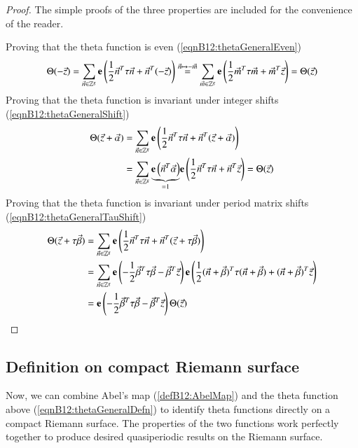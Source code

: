 \begin{proof} The simple proofs of the three properties are included for the convenience of the reader.

    Proving that the theta function is even (\ref{eqnB12:thetaGeneralEven})
    \begin{align}
        \Theta(-\vec z) = \sum_{\vec n \in \mathbb Z^g} \mathbf{e}\left(\frac{1}{2} \vec n^T \tau \vec n + \vec n^T (-\vec z)\right) \overset{\vec n \mapsto -\vec m}{=} \sum_{\vec m \in \mathbb Z^g} \mathbf{e}\left(\frac{1}{2} \vec m^T \tau \vec m + \vec m^T \vec z\right) = \Theta(\vec z)
    \end{align}
    Proving that the theta function is invariant under integer shifts (\ref{eqnB12:thetaGeneralShift})
    \begin{align}
        \Theta(\vec z + \vec \alpha) &= \sum_{\vec n \in \mathbb Z^g} \mathbf{e}\left(\frac{1}{2} \vec n^T \tau \vec n + \vec n^T (\vec z + \vec \alpha)\right) \\ &=
        \sum_{\vec n \in \mathbb Z^g} \underset{=1}{\underbrace{\mathbf{e}\left(\vec n^T \vec \alpha\right)}} \mathbf{e}\left(\frac{1}{2} \vec n^T \tau \vec n + \vec n^T \vec z\right) = \Theta(\vec z)
    \end{align}
    Proving that the theta function is invariant under period matrix shifts (\ref{eqnB12:thetaGeneralTauShift})
    \begin{align}
        \Theta(\vec z + \tau \vec \beta) &= \sum_{\vec n \in \mathbb Z^g} \mathbf{e}\left(\frac{1}{2} \vec n^T \tau \vec n + \vec n^T (\vec z + \tau \vec \beta)\right) \\ &=
        \sum_{\vec n \in \mathbb Z^g}
        \mathbf{e}\left(-\frac{1}{2} \vec \beta^T \tau \vec \beta - \vec \beta^T \vec z\right) \mathbf{e}\left(\frac{1}{2} (\vec n+\vec \beta)^T \tau (\vec n+\vec \beta) + (\vec n+\vec \beta)^T \vec z\right)\\
        &=  \mathbf{e}\left(-\frac{1}{2} \vec \beta^T \tau \vec \beta - \vec \beta^T \vec z\right) \Theta(\vec z) 
    \end{align}
\end{proof}

\subsection{Definition on compact Riemann surface}
Now, we can combine Abel's map (\ref{defB12:AbelMap}) and the theta function above (\ref{eqnB12:thetaGeneralDefn}) to identify theta functions directly on a compact Riemann surface. The properties of the two functions work perfectly together to produce desired quasiperiodic results on the Riemann surface.

